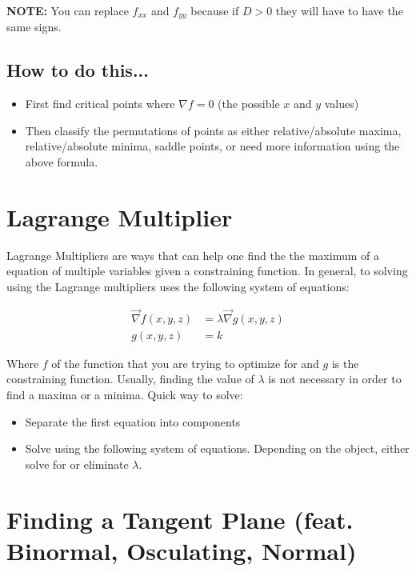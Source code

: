 \documentclass{article}
\begin{document}
\textbf{NOTE:} You can replace $f_{xx}$ and $f_{yy}$ because if $D > 0$ they will have to have the same signs.

\subsection{How to do this...}

\begin{itemize}
    \item First find critical points where $\nabla f = 0$ (the possible $x$ and $y$ values)
    \item Then classify the permutations of points as either relative/absolute maxima, relative/absolute minima, saddle points, or need more information using the above formula.
\end{itemize}

\section{Lagrange Multiplier}

Lagrange Multipliers are ways that can help one find the the maximum of a equation of multiple variables given a constraining function. In general, to solving using the Lagrange multipliers uses the following system of equations:

\begin{align*}
    \vec{\nabla} f(x, y, z) & = \lambda \vec{\nabla} g(x, y, z) \\
    g(x, y, z)              & = k
\end{align*}

Where $f$ of the function that you are trying to optimize for and $g$ is the constraining function. Usually, finding the value of $\lambda$ is not necessary in order to find a maxima or a minima. Quick way to solve:

\begin{itemize}
    \item Separate the first equation into components
    \item Solve using the following system of equations. Depending on the object, either solve for or eliminate $\lambda$.
\end{itemize}

\section{Finding a Tangent Plane (feat. Binormal, Osculating, Normal)}
\end{document}
